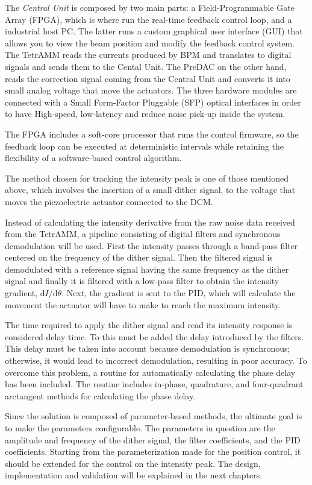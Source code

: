 The \textit{Central Unit} is composed by two main parts: a Field-Programmable Gate Array (FPGA), which is where run the real-time feedback control loop, and a industrial host PC.
The latter runs a custom graphical user interface (GUI) that allows you to view the beam position and modify the feedback control system.
The TetrAMM reads the currents produced by BPM and translates to digital signals and sends them to the Cental Unit.
The PreDAC on the other hand, reads the correction signal coming from the Central Unit and converts it into small analog voltage that move the actuators.
The three hardware modules are connected with a Small Form-Factor Pluggable (SFP) optical interfaces in order to have High-speed, low-latency and reduce noise pick-up inside the system.

The FPGA includes a soft-core processor that runs the control firmware, so the feedback loop can be executed at deterministic intervals while retaining the flexibility of a software-based control algorithm.

The method chosen for tracking the intensity peak is one of those mentioned above, which involves the insertion of a small dither signal, to the voltage that moves the piezoelectric actuator connected to the DCM.

Instead of calculating the intensity derivative from the raw noise data received from the TetrAMM, a pipeline consisting of digital filters and synchronous demodulation will be used.
First the intensity passes through a band-pass filter centered on the frequency of the dither signal.
Then the filtered signal is demodulated with a reference signal having the same frequency as the dither signal and finally it is filtered with a low-pass filter to obtain the intensity gradient, $\mathrm{d}I/\mathrm{d}\theta$.
Next, the gradient is sent to the PID, which will calculate the movement the actuator will have to make to reach the maximum intensity.

The time required to apply the dither signal and read its intensity response is considered delay time.
To this must be added the delay introduced by the filters.
This delay must be taken into account because demodulation is synchronous; otherwise, it would lead to incorrect demodulation, resulting in poor accuracy.
To overcome this problem, a routine for automatically calculating the phase delay has been included.
The routine includes in-phase, quadrature, and four-quadrant arctangent methods for calculating the phase delay.

Since the solution is composed of parameter-based methods, the ultimate goal is to make the parameters configurable.
The parameters in question are the amplitude and frequency of the dither signal, the filter coefficients, and the PID coefficients.
Starting from the parameterization made for the position control, it should be extended for the control on the intensity peak.
The design, implementation and validation will be explained in the next chapters.

